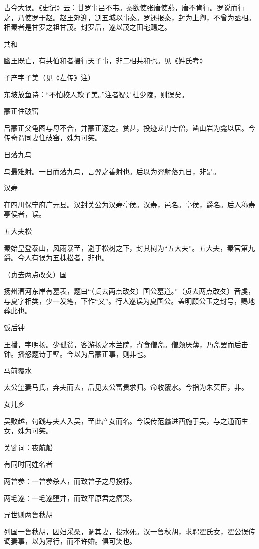 \documentclass[a4paper,12pt,UTF8,twoside]{ctexbook}
\begin{document}
    古今大误。《史记》云：甘罗事吕不韦。秦欲使张唐使燕，唐不肯行。罗说而行之，乃使罗于赵。赵王郊迎，割五城以事秦。罗还报秦，封为上卿，不曾为丞相。相秦者是甘罗之祖甘茂。封罗后，遂以茂之田宅赐之。
    
    共和
    
    幽王既亡，有共伯和者摄行天子事，非二相共和也。见《姓氏考》
    
    子产字子美（见《左传》注）
    
    东坡放鱼诗：“不怕校人欺子美。”注者疑是杜少陵，则误矣。
    
    蒙正住破窑
    
    吕蒙正父龟图与母不合，并蒙正逐之。贫甚，投迹龙门寺僧，凿山岩为龛以居。今传奇谓同妻住破窑，殊为可笑。
    
    日落九乌
    
    乌最难射。一日而落九乌，言羿之善射也。后以为羿射落九日，非是。
    
    汉寿
    
    在四川保宁府广元县。汉封关公为汉寿亭侯。汉寿，邑名。亭侯，爵名。后人称寿亭侯者，误。
    
    五大夫松
    
    秦始皇登泰山，风雨暴至，避于松树之下，封其树为“五大夫”。五大夫，秦官第九爵。今人有误为五株松者，非也。
    
    （贞去两点改夂）国
    
    扬州漕河东岸有墓表，题曰“（贞去两点改夂）国公墓道。”（贞去两点改夂）音虔，与夏字相类，少一发笔，下作“又”。行人遂误为夏国公。盖明顾公玉之封号，赐地葬此也。
    
    饭后钟
    
    王播，字明扬。少孤贫，客游扬之木兰院，寄食僧斋。僧颇厌薄，乃斋罢而后击钟。播怒题诗于壁。今以为吕蒙正事，则非也。
    
    马前覆水
    
    太公望妻马氏，弃夫而去，后见太公富贵求归。命收覆水。今指为朱买臣，非。
    
    女儿乡
    
    吴败越，句践与夫人入吴，至此产女而名。今误传范蠡进西施于吴，与之通而生女，殊为可笑。
    
    关键词：夜航船
    
    有同时同姓名者
    
    两曾参：一曾参杀人，而致曾子之母投杼。
    
    两毛遂：一毛遂堕井，而致平原君之痛哭。
    
    异世则两鲁秋胡
    
    列国一鲁秋胡，因妇采桑，调其妻，投水死。汉一鲁秋胡，求聘翟氏女，翟公误传调妻事，以为薄行，而不许婚。俱可笑也。
    
\end{document}
